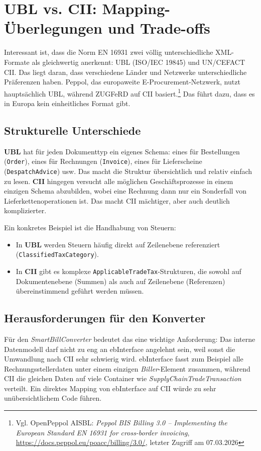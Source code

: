 \section{UBL vs. CII: Mapping-Überlegungen und Trade-offs}
\label{sec:ubl_cii}

Interessant ist, dass die Norm EN 16931 zwei völlig unterschiedliche XML-Formate als gleichwertig anerkennt: UBL (ISO/IEC 19845) und UN/CEFACT CII. Das liegt daran, dass verschiedene Länder und Netzwerke unterschiedliche Präferenzen haben. Peppol, das europaweite E-Procurement-Netzwerk, nutzt hauptsächlich UBL, während ZUGFeRD auf CII basiert.\footnote{Vgl. OpenPeppol AISBL: \textit{Peppol BIS Billing 3.0 -- Implementing the European Standard EN 16931 for cross-border invoicing}, \url{https://docs.peppol.eu/poacc/billing/3.0/}, letzter Zugriff am 07.03.2026} Das führt dazu, dass es in Europa kein einheitliches Format gibt.

\subsection{Strukturelle Unterschiede}
\textbf{UBL} hat für jeden Dokumenttyp ein eigenes Schema: eines für Bestellungen (\texttt{Order}), eines für Rechnungen (\texttt{Invoice}), eines für Lieferscheine (\texttt{DespatchAdvice}) usw. Das macht die Struktur übersichtlich und relativ einfach zu lesen. \textbf{CII} hingegen versucht alle möglichen Geschäftsprozesse in einem einzigen Schema abzubilden, wobei eine Rechnung dann nur ein Sonderfall von Lieferkettenoperationen ist. Das macht CII mächtiger, aber auch deutlich komplizierter.

Ein konkretes Beispiel ist die Handhabung von Steuern:
\begin{itemize}
    \item In \textbf{UBL} werden Steuern häufig direkt auf Zeilenebene referenziert (\texttt{Classified\-Tax\-Category}).
    \item In \textbf{CII} gibt es komplexe \texttt{ApplicableTradeTax}-Strukturen, die sowohl auf Dokumentenebene (Summen) als auch auf Zeilenebene (Referenzen) übereinstimmend geführt werden müssen.
\end{itemize}

\subsection{Herausforderungen für den Konverter}
Für den \textit{SmartBillConverter} bedeutet das eine wichtige Anforderung: Das interne Datenmodell darf nicht zu eng an ebInterface angelehnt sein, weil sonst die Umwandlung nach CII sehr schwierig wird. ebInterface fasst zum Beispiel alle Rechnungsstellerdaten unter einem einzigen \textit{Biller}-Element zusammen, während CII die gleichen Daten auf viele Container wie \textit{SupplyChainTradeTransaction} verteilt. Ein direktes Mapping von ebInterface auf CII würde zu sehr unübersichtlichem Code führen.

